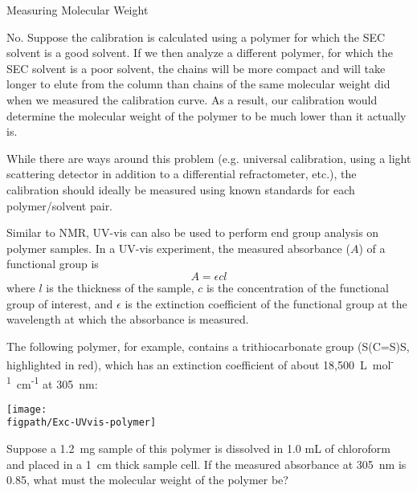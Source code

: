 \begin{activity}{Measuring Molecular Weight}
\begin{ctqs}
			\begin{solution}[1.5in]{}
				No.  Suppose the calibration is calculated using a polymer for which the SEC solvent is a good solvent.  If we then analyze a different polymer, for which the SEC solvent is a poor solvent, the chains will be more compact and will take longer to elute from the column than chains of the same molecular weight did when we measured the calibration curve.  As a result, our calibration would determine the molecular weight of the polymer to be much lower than it actually is.
				
				While there are ways around this problem (e.g. universal calibration, using a light scattering detector in addition to a differential refractometer, etc.), the calibration should ideally be measured using known standards for each polymer/solvent pair.
			\end{solution}
	
	
	
\end{ctqs}


\begin{exercises}

	\exercise Similar to NMR, UV-vis can also be used to perform end group analysis on polymer samples.  In a UV-vis experiment, the measured absorbance ($A$) of a functional group is
		\begin{equation*}
			A = \epsilon c l
		\end{equation*}
		where $l$ is the thickness of the sample, $c$ is the concentration of the functional group of interest, and $\epsilon$ is the extinction coefficient of the functional group at the wavelength at which the absorbance is measured.
		
		The following polymer, for example, contains a trithiocarbonate group (S(C=S)S,  highlighted in red), which has an extinction coefficient of about 18,500~L~mol\textsuperscript{-1}~cm\textsuperscript{-1} at 305~nm:
		
			\centerline{\texttt{[image: \\figpath/Exc-UVvis-polymer]}}
		
		Suppose a 1.2~mg sample of this polymer is dissolved in 1.0 mL of chloroform and placed in a 1~cm thick sample cell.  If the measured absorbance at 305~nm is 0.85, what must the molecular weight of the polymer be?
		

\end{exercises}
\end{activity}
